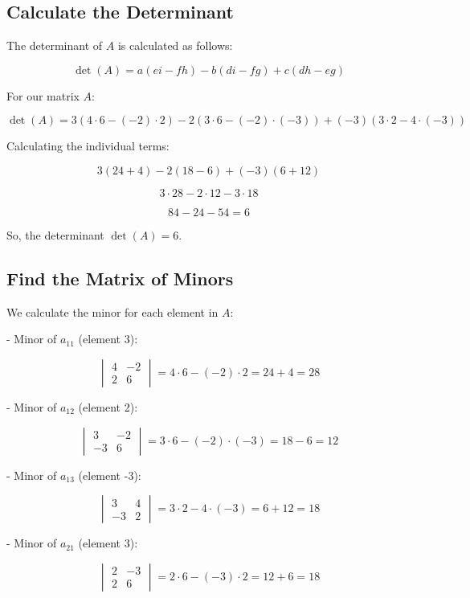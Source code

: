 \documentclass{article}
\begin{document}
\subsection{Calculate the Determinant}
The determinant of \(A\) is calculated as follows:

\[
\det(A) = a(ei - fh) - b(di - fg) + c(dh - eg)
\]

For our matrix \(A\):

\[
\det(A) = 3 \left(4 \cdot 6 - (-2) \cdot 2\right) - 2 \left(3 \cdot 6 - (-2) \cdot (-3)\right) + (-3) \left(3 \cdot 2 - 4 \cdot (-3)\right)
\]

Calculating the individual terms:

\[
3 \left(24 + 4\right) - 2 \left(18 - 6\right) + (-3) \left(6 + 12\right)
\]

\[
3 \cdot 28 - 2 \cdot 12 - 3 \cdot 18
\]

\[
84 - 24 - 54 = 6
\]

So, the determinant \(\det(A) = 6\).

\subsection{Find the Matrix of Minors}
We calculate the minor for each element in \(A\):

- Minor of \(a_{11}\) (element 3):

\[
\begin{vmatrix}
4 & -2 \\
2 & 6
\end{vmatrix} = 4 \cdot 6 - (-2) \cdot 2 = 24 + 4 = 28
\]

- Minor of \(a_{12}\) (element 2):

\[
\begin{vmatrix}
3 & -2 \\
-3 & 6
\end{vmatrix} = 3 \cdot 6 - (-2) \cdot (-3) = 18 - 6 = 12
\]

- Minor of \(a_{13}\) (element -3):

\[
\begin{vmatrix}
3 & 4 \\
-3 & 2
\end{vmatrix} = 3 \cdot 2 - 4 \cdot (-3) = 6 + 12 = 18
\]

- Minor of \(a_{21}\) (element 3):

\[
\begin{vmatrix}
2 & -3 \\
2 & 6
\end{vmatrix} = 2 \cdot 6 - (-3) \cdot 2 = 12 + 6 = 18
\]
\end{document}
